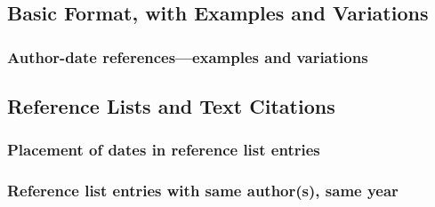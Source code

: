 \documentclass[11pt,letterpaper,oneside]{article}
\begin{document}
\subsection{Basic Format, with Examples and Variations}
\setcounter{subsection}{15}

\setcounter{subsubsection}{8}
\subsubsection{Author-date references—examples and variations}
\label{15.9}

\begin{citeref}
\item \parencite[87--88]{strayed2012}
\item \parencite[32]{daum2015}
\item \parencite[188]{grazer2015}
\item \parencite[242--55]{garcia1988}
\item \parencite[310]{gould1984a}
\item \parencite[484--85]{bagley2015}
\item \parencite[312]{liu2015}
\end{citeref}

\setcounter{subsection}{1}
\subsection{Reference Lists and Text Citations}
\setcounter{subsection}{15}

\setcounter{subsubsection}{13}
\subsubsection{Placement of dates in reference list entries}
\label{15.14}

\begin{citeref}
\item \parencite{pager2015}
\item \parencite{unger2014}
\end{citeref}

\setcounter{subsubsection}{19}
\subsubsection{Reference list entries with same author(s), same year}
\label{15.20}
\end{document}
